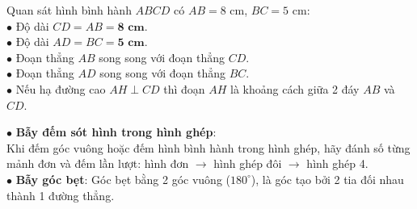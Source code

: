 \documentclass[14pt,a4paper,oneside]{extbook}
\begin{document}
\noindent
\begin{minipage}[t]{0.53\textwidth}
  \begin{tcolorbox}[
    enhanced,
    title={\footnotesize\bfseries\color{white}\faCheckCircle\ Ví dụ thực hành chuẩn mực},
    colback=green!2!white,
    colframe=green!60!black,
    arc=2.5mm, boxrule=0.8pt, top=1.8mm, bottom=1.8mm, left=2.2mm, right=2.2mm
  ]
    \footnotesize
    Quan sát hình bình hành $ABCD$ có $AB = 8\text{ cm}$, $BC = 5\text{ cm}$:\\
    $\bullet$ Độ dài $CD = AB = \mathbf{8\text{ cm}}$.\\
    $\bullet$ Độ dài $AD = BC = \mathbf{5\text{ cm}}$.\\
    $\bullet$ Đoạn thẳng $AB$ song song với đoạn thẳng $CD$.\\
    $\bullet$ Đoạn thẳng $AD$ song song với đoạn thẳng $BC$.\\
    $\bullet$ Nếu hạ đường cao $AH \perp CD$ thì đoạn $AH$ là khoảng cách giữa 2 đáy $AB$ và $CD$.
  \end{tcolorbox}
\end{minipage}%
\hfill
\begin{minipage}[t]{0.45\textwidth}
  \begin{tcolorbox}[
    enhanced,
    title={\footnotesize\bfseries\color{white}\faExclamationTriangle\ Mẹo tránh bẫy trắc nghiệm},
    colback=red!2!white,
    colframe=red!70!black,
    arc=2.5mm, boxrule=0.8pt, top=1.8mm, bottom=1.8mm, left=2.2mm, right=2.2mm
  ]
    \footnotesize
    $\bullet$ \textbf{Bẫy đếm sót hình trong hình ghép}:\\
    Khi đếm góc vuông hoặc đếm hình bình hành trong hình ghép, hãy đánh số từng mảnh đơn và đếm lần lượt: hình đơn $\rightarrow$ hình ghép đôi $\rightarrow$ hình ghép 4.\\
    $\bullet$ \textbf{Bẫy góc bẹt}: Góc bẹt bằng 2 góc vuông ($180^\circ$), là góc tạo bởi 2 tia đối nhau thành 1 đường thẳng.
  \end{tcolorbox}
\end{minipage}
\end{document}
